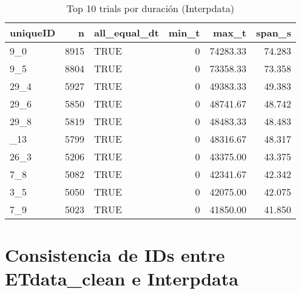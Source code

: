 \documentclass[
]{article}
\newenvironment{Shaded}{\begin{snugshade}}{\end{snugshade}}
\newcommand{\AttributeTok}[1]{\textcolor[rgb]{0.13,0.29,0.53}{#1}}
\newcommand{\ConstantTok}[1]{\textcolor[rgb]{0.56,0.35,0.01}{#1}}
\newcommand{\FunctionTok}[1]{\textcolor[rgb]{0.13,0.29,0.53}{\textbf{#1}}}
\newcommand{\NormalTok}[1]{#1}
\newcommand{\OtherTok}[1]{\textcolor[rgb]{0.56,0.35,0.01}{#1}}
\newcommand{\SpecialCharTok}[1]{\textcolor[rgb]{0.81,0.36,0.00}{\textbf{#1}}}
\begin{document}
\begin{longtable}[t]{lrlrrr}
\caption{\label{tab:unnamed-chunk-9}Top 10 trials por duración (Interpdata)}\\
\toprule
uniqueID & n & all\_equal\_dt & min\_t & max\_t & span\_s\\
\midrule
9\_0 & 8915 & TRUE & 0 & 74283.33 & 74.283\\
9\_5 & 8804 & TRUE & 0 & 73358.33 & 73.358\\
29\_4 & 5927 & TRUE & 0 & 49383.33 & 49.383\\
29\_6 & 5850 & TRUE & 0 & 48741.67 & 48.742\\
29\_8 & 5819 & TRUE & 0 & 48483.33 & 48.483\\
\addlinespace
9\_13 & 5799 & TRUE & 0 & 48316.67 & 48.317\\
26\_3 & 5206 & TRUE & 0 & 43375.00 & 43.375\\
7\_8 & 5082 & TRUE & 0 & 42341.67 & 42.342\\
3\_5 & 5050 & TRUE & 0 & 42075.00 & 42.075\\
7\_9 & 5023 & TRUE & 0 & 41850.00 & 41.850\\
\bottomrule
\end{longtable}

\section{Consistencia de IDs entre ETdata\_clean e
Interpdata}\label{consistencia-de-ids-entre-etdata_clean-e-interpdata}

\begin{Shaded}
\end{Shaded}
\end{document}
